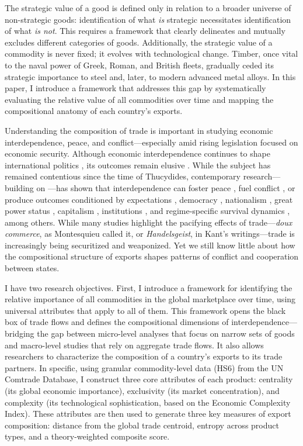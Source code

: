 \documentclass[12pt]{article}
\begin{document}
The strategic value of a good is defined only in relation to a broader universe of non-strategic goods: identification of what \textit{is} strategic necessitates identification of what \textit{is not}. This requires a framework that clearly delineates and mutually excludes different categories of goods. Additionally, the strategic value of a commodity is never fixed; it evolves with technological change. Timber, once vital to the naval power of Greek, Roman, and British fleets, gradually ceded its strategic importance to steel and, later, to modern advanced metal alloys. In this paper, I introduce a framework that addresses this gap by systematically evaluating the relative value of all commodities over time and mapping the compositional anatomy of each country’s exports.

Understanding the composition of trade is important in studying economic interdependence, peace, and conflict—especially amid rising legislation focused on economic security. Although economic interdependence continues to shape international politics \parencite{keohane2020globalization, solingen2025global}, its outcomes remain elusive \parencites{brooks2024trade, chang2017economic}. While the subject has remained contentious since the time of Thucydides, contemporary research—building on \textcite{hirschman1980}—has shown that interdependence can foster peace \parencite{russett1998third}, fuel conflict \parencite{barbieri1996economic}, or produce outcomes conditioned by expectations \parencite{copeland2014}, democracy \parencite{gelpi2008}, nationalism \parencite{choi2023does}, great power status \parencite{levy2023systemic}, capitalism \parencite{gartzke2007}, institutions \parencite{petersonwen2021}, and regime-specific survival dynamics \parencite{solingen2021}, among others. While many studies highlight the pacifying effects of trade—\textit{doux commerce}, as Montesquieu called it, or \textit{Handelsgeist}, in Kant’s writings—trade is increasingly being securitized and weaponized. Yet we still know little about how the compositional structure of exports shapes patterns of conflict and cooperation between states.

I have two research objectives. First, I introduce a framework for identifying the relative importance of all commodities in the global marketplace over time, using universal attributes that apply to all of them. This framework opens the black box of trade flows and defines the compositional dimensions of interdependence—bridging the gap between micro-level analyses that focus on narrow sets of goods and macro-level studies that rely on aggregate trade flows. It also allows researchers to characterize the composition of a country’s exports to its trade partners. In specific, using granular commodity-level data (HS6) from the UN Comtrade Database, I construct three core attributes of each product: centrality (its global economic importance), exclusivity (its market concentration), and complexity (its technological sophistication, based on the Economic Complexity Index). These attributes are then used to generate three key measures of export composition: distance from the global trade centroid, entropy across product types, and a theory-weighted composite score.
\end{document}
